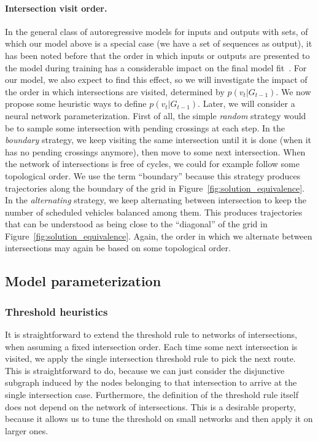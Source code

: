 \documentclass[a4paper]{article}
\theoremstyle{definition}
\theoremstyle{plain}
\begin{document}
\paragraph{Intersection visit order.}
In the general class of autoregressive models for inputs and outputs with sets,
of which our model above is a special case (we have a set of sequences as
output), it has been noted before that the order in which inputs or outputs are
presented to the model during training has a considerable impact on the final
model fit~\cite{vinyalsOrderMattersSequence2016}.
%
For our model, we also expect to find this effect, so we will investigate the
impact of the order in which intersections are visited, determined by
$p(v_{t} | G_{t-1})$. We now propose some heuristic ways to define
$p(v_{t} | G_{t-1})$. Later, we will consider a neural network parameterization.
First of all, the simple \textit{random} strategy would be to sample some
intersection with pending crossings at each step.
In the \textit{boundary} strategy, we keep visiting the same intersection until
it is done (when it has no pending crossings anymore), then move to some next
intersection. When the network of intersections is free of cycles, we could for
example follow some topological order. We use the term ``boundary'' because this
strategy produces trajectories along the boundary of the grid in
Figure~\ref{fig:solution_equivalence}.
In the \textit{alternating} strategy, we keep alternating between intersection to keep
the number of scheduled vehicles balanced among them. This produces trajectories
that can be understood as being close to the ``diagonal'' of the grid in
Figure~\ref{fig:solution_equivalence}. Again, the order in which we alternate between intersections may
again be based on some topological order.


\subsection{Model parameterization}

\subsubsection{Threshold heuristics}
It is straightforward to extend the threshold rule to networks of
intersections, when assuming a fixed intersection order. Each time some
next intersection is visited, we apply the single intersection threshold rule to
pick the next route. This is straightforward to do, because we can just consider
the disjunctive subgraph induced by the nodes belonging to that intersection to
arrive at the single intersection case.
%
Furthermore, the definition of the threshold rule itself does not depend on the
network of intersections. This is a desirable property, because it allows us to
tune the threshold on small networks and then apply it on larger ones.
\end{document}
